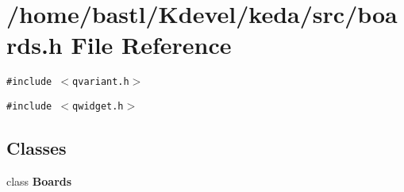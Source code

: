 \section{/home/bastl/Kdevel/keda/src/boards.h File Reference}
\label{boards_8h}
{\tt \#include $<$qvariant.h$>$}\par
{\tt \#include $<$qwidget.h$>$}\par
\subsection*{Classes}
\begin{CompactItemize}
\item 
class {\bf Boards}
\end{CompactItemize}
